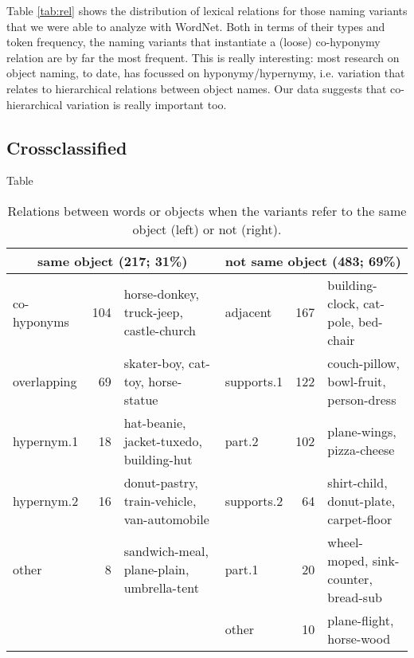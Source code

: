  

Table \ref{tab:rel} shows the distribution of lexical relations for those naming variants that we were able to analyze with WordNet.
Both in terms of their types and token frequency, the naming variants that instantiate a (loose) co-hyponymy relation are by far the most frequent.
This is really interesting: most research on object naming, to date, has focussed on hyponymy/hypernymy, i.e. variation that relates to hierarchical relations between object names.
Our data suggests that co-hierarchical variation is really important too.

\subsection{Crossclassified}

Table

\begin{table*}
  \label{tab:crossclass}
\small
\begin{tabular}{lrl|lrl}
  \toprule
    \multicolumn{3}{c}{same object (217; 31\%)} & \multicolumn{3}{c}{not same object (483; 69\%)}\\
\midrule
co-hyponyms &          104  & horse-donkey, truck-jeep, castle-church & adjacent   &          167 & building-clock, cat-pole, bed-chair\\
overlapping &           69  & skater-boy, cat-toy, horse-statue & supports.1 &          122 & couch-pillow, bowl-fruit, person-dress\\
hypernym.1  &           18  & hat-beanie, jacket-tuxedo, building-hut & part.2     &102& plane-wings, pizza-cheese\\
hypernym.2  &           16  & donut-pastry, train-vehicle, van-automobile & supports.2 &           64 & shirt-child, donut-plate, carpet-floor\\
other       &            8  & sandwich-meal, plane-plain, umbrella-tent & part.1     &           20 & wheel-moped, sink-counter, bread-sub\\
	    & 		    & & other      &           10 & plane-flight, horse-wood\\
\bottomrule
\end{tabular}
\caption{Relations between words or objects when the variants refer to the same object (left) or not (right).}
\end{table*}

